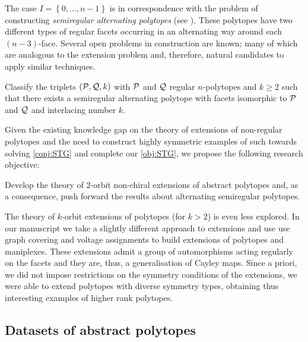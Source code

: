\documentclass[a4paper,12pt,english]{article}
\begin{document}
The case $I=\left\{ 0, \dots, n-1 \right\} $ is in correspondence with the problem of constructing \emph{semiregular alternating polytopes} (see \cite{MonsoSchul2022_InterlacingNumberAlternating,MonsoSchul2020_UniversalAlternatingSemiregular,MonsoSchul2019_AssemblyProblemAlternating,MonsoSchul2012_SemiregularPolytopesAmalgamated}).
These polytopes have two different types of regular facets occurring in an alternating way around each $(n-3)$-face. Several open problems in construction are known; many of which are analogous to the extension problem and, therefore, natural candidates to apply similar techniques.


\begin{problem}\label{prob:semiregular}
  Classify the triplets $(\mathcal{P}, \mathcal{Q}, k)$ with $\mathcal{P}$ and $\mathcal{Q}$ regular $n$-polytopes and $k \geq 2$ such that there exists a semiregular alternating polytope with facets isomorphic to $\mathcal{P}$ and $\mathcal{Q}$ and interlacing number $k$.
\end{problem}

Given the existing knowledge gap on the theory of extensions of non-regular polytopes and the need to construct highly symmetric examples of such towards solving \cref{conj:STG} and complete our \cref{obj:STG}, we propose the following research objective:

\begin{obj}\label{obj:2_I}
  Develop the theory of $2$-orbit non-chiral extensions of abstract polytopes and, as a consequence, push forward the results about alternating semiregular polytopes.
\end{obj}

The theory of $k$-orbit extensions of polytopes (for $k > 2$) is even less explored. 
In our manuscript \cite{CunnMocMon_CayleyExtensionsManiplexes_preprint} we take a slightly different approach to extensions and use use graph covering and voltage assignments to build extensions of polytopes and maniplexes. 
These extensions admit a group of automorphisms acting regularly on the facets and they are, thus, a generalisation of Cayley maps. 
Since a priori, we did not impose restrictions on the symmetry conditions of the extensions, we were able to extend polytopes with diverse symmetry types, obtaining thus interesting examples of higher rank polytopes.

\subsection*{Datasets of abstract polytopes} \label{sec:datasets}
\end{document}

